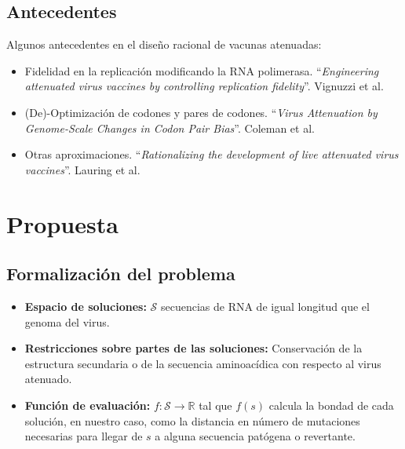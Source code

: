 \documentclass{beamer}
\begin{document}
\subsection{Antecedentes}
\begin{frame}
Algunos antecedentes en el dise\~no racional de vacunas atenuadas:
 \begin{itemize}
  \item Fidelidad en la replicaci\'on modificando la RNA polimerasa.
``\textit{Engineering attenuated virus vaccines by controlling replication
fidelity}''. Vignuzzi et al. 
  \item (De)-Optimizaci\'on de codones y pares de codones.
``\textit{Virus Attenuation by Genome-Scale Changes in Codon Pair Bias}''.
Coleman et al.
  \item Otras aproximaciones. ``\textit{Rationalizing the development of live
attenuated virus vaccines}''. Lauring et al.
 \end{itemize}
\end{frame}

\section{Propuesta}
\subsection{Formalizaci\'on del problema}
\begin{frame}

\begin{itemize} 
 \item \textbf{Espacio de soluciones:} $\mathcal{S}$ secuencias de RNA de igual
longitud que el genoma del virus. 

 \item \textbf{Restricciones sobre partes de las soluciones:} Conservaci\'on de
la estructura secundaria o de la secuencia aminoac\'idica con respecto al virus
atenuado.

 \item \textbf{Funci\'on de evaluaci\'on:} $f: \mathcal{S} \rightarrow
\mathbb{R}$ tal que $f(s)$ calcula la bondad de cada soluci\'on, en
nuestro caso, como la distancia en n\'umero de mutaciones necesarias para
llegar de $s$ a alguna secuencia pat\'ogena o revertante.
\end{itemize}
\end{frame}
\end{document}
